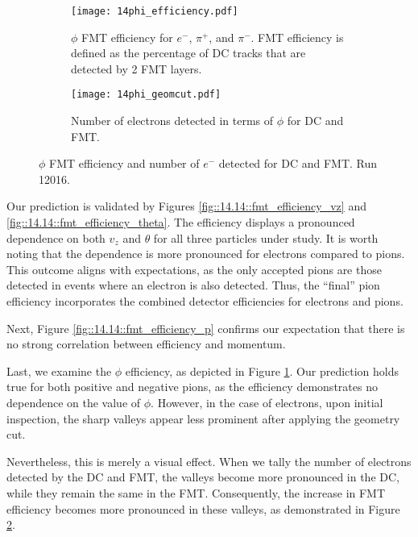     \begin{figure}
        \begin{subfigure}[b]{\textwidth}
            \texttt{[image: 14phi\_efficiency.pdf]}
            \caption{$\phi$ FMT efficiency for $e^-$, $\pi^+$, and $\pi^-$.
            FMT efficiency is defined as the percentage of DC tracks that are detected by 2 FMT layers.}
            \label{fig::14.14::fmt_efficiency_phi}
        \end{subfigure}
        \begin{subfigure}[b]{\textwidth}
            \texttt{[image: 14phi\_geomcut.pdf]}
            \caption{Number of electrons detected in terms of $\phi$ for DC and FMT.}
            \label{fig::14.14::phi_geomcut}
        \end{subfigure}

        \caption[$\phi$ efficiency and geometry cut study, run 12016]
        {$\phi$ FMT efficiency and number of $e^-$ detected for DC and FMT.
        Run 12016.}
        \label{fig::14.14::phi_study}
    \end{figure}

    Our prediction is validated by Figures \ref{fig::14.14::fmt_efficiency_vz} and \ref{fig::14.14::fmt_efficiency_theta}.
    The efficiency displays a pronounced dependence on both $v_z$ and $\theta$ for all three particles under study.
    It is worth noting that the dependence is more pronounced for electrons compared to pions.
    This outcome aligns with expectations, as the only accepted pions are those detected in events where an electron is also detected.
    Thus, the ``final'' pion efficiency incorporates the combined detector efficiencies for electrons and pions.

    Next, Figure \ref{fig::14.14::fmt_efficiency_p} confirms our expectation that there is no strong correlation between efficiency and momentum.

    Last, we examine the $\phi$ efficiency, as depicted in Figure \ref{fig::14.14::fmt_efficiency_phi}.
    Our prediction holds true for both positive and negative pions, as the efficiency demonstrates no dependence on the value of $\phi$.
    However, in the case of electrons, upon initial inspection, the sharp valleys appear less prominent after applying the geometry cut.

    Nevertheless, this is merely a visual effect.
    When we tally the number of electrons detected by the DC and FMT, the valleys become more pronounced in the DC, while they remain the same in the FMT.
    Consequently, the increase in FMT efficiency becomes more pronounced in these valleys, as demonstrated in Figure \ref{fig::14.14::phi_geomcut}.
